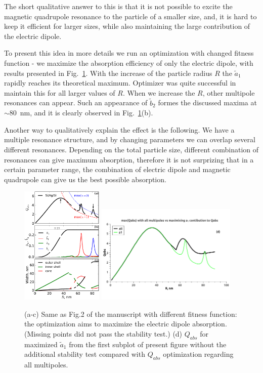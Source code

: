 \documentclass[a4paper]{article}
\begin{document}
The short qualitative answer to this is that it is not possible to excite the magnetic quadrupole resonance to the particle of a smaller size, and, it is hard to keep it efficient for larger sizes, while also maintaining the large contribution of the electric dipole.

To present this idea in more details we run an optimization with changed fitness function - we maximize the absorption efficiency of only the electric dipole, with results presented in Fig.~\ref{fig:a1max}. With the increase of the particle radius $R$ the $\tilde{a}_1$ rapidly reaches its theoretical maximum. Optimizer was
quite successful in maintain this for all larger values of $R$. When we increase the $R$, other multipole resonances can appear. Such an appearance of $\tilde{b}_2$ formes the discussed maxima at $\sim 80$~nm, and it is clearly observed in Fig.~\ref{fig:a1max}(b). 

Another way to qualitatively explain the effect is the following. We have a multiple resonance structure, and by changing parameters we can overlap several different resonances. Depending on the total particle size, different combination of resonances can give maximum absorption, therefore it is not surprizing that in a certain parameter range, the combination of electric dipole and magnetic quadrupole can give us the best possible absorption.

\begin{figure}
  \includegraphics[width=0.35\textwidth]{overview-Qabs-a1}
   \includegraphics[width=0.60\textwidth]{overview-Qabs-all-a1}
  \caption{(a-c) Same as Fig.2 of the manuscript with different fitness function: the optimization
    aims to maximize the electric dipole absorption. (Missing points did not pass the stability test.) (d) $Q_{abs}$ for maximized  $\tilde{a}_1$ from the first subplot of present figure without the additional stability test compared with $Q_{abs}$ optimization regarding all multipoles.\label{fig:a1max}}
\end{figure}
\end{document}
